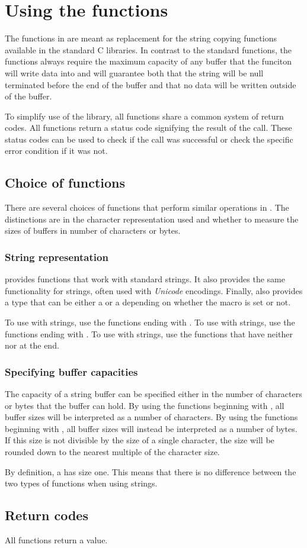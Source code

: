 \section{Using the \strsafe{} functions}
The functions in \strsafe{} are meant as replacement for
the string copying functions available in the standard C libraries.
In contrast to the standard functions,
the functions always require the maximum capacity of any buffer
that the funciton will write data into
and will guarantee both
that the string will be null terminated before the end of the buffer
and that no data will be written outside of the buffer.

To simplify use of the library,
all functions share a common system of return codes.
All functions return a status code signifying the result of the call.
These status codes can be used to check if the call was successful
or check the specific error condition if it was not.

\subsection{Choice of functions}
There are several choices of functions
that perform similar operations in \strsafe{}.
The distinctions are in the character representation used
and whether to measure the sizes of buffers
in number of characters or bytes.

\subsubsection{String representation}
\strsafe{} provides functions that work with standard  strings.
It also provides the same functionality for  strings,
often used with \emph{Unicode} encodings.
Finally, \strsafe{} also provides a  type that can be either a
 or a  depending on
whether the macro  is set or not.

To use \strsafe{} with  strings,
use the functions ending with .
To use \strsafe{} with  strings,
use the functions ending with .
To use \strsafe{} with  strings,
use the functions that have neither  nor  at the end.

\subsubsection{Specifying buffer capacities}
The capacity of a string buffer can be specified either in the number of
characters or bytes that the buffer can hold.
By using the functions beginning with ,
all buffer sizes will be interpreted as a number of characters.
By using the functions beginning with ,
all buffer sizes will instead be interpreted as a number of bytes.
If this size is not divisible by the size of a single character,
the size will be rounded down to the nearest multiple of the character size.

By definition, a  has size one.
This means that there is no difference between the two types of functions
when using  strings.

\subsection{Return codes}
All functions return a  value.
